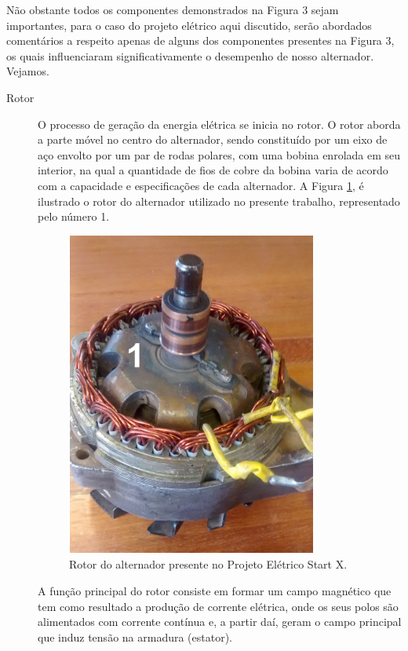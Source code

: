 Não obstante todos os componentes demonstrados na Figura 3 sejam importantes, para o caso do projeto elétrico aqui discutido, serão abordados comentários a respeito apenas de alguns dos componentes presentes na Figura 3, os quais influenciaram significativamente o desempenho de nosso alternador. Vejamos. 

\begin{description}

\item [Rotor]

O processo de geração da energia elétrica se inicia no rotor. O rotor aborda a parte móvel no centro do alternador, sendo constituído por um eixo de aço envolto por um par de rodas polares, com uma bobina enrolada em seu interior, na qual a quantidade de fios de cobre da bobina varia de acordo com a capacidade e especificações de cada alternador. A Figura \ref{rotor-alternador}, é ilustrado o rotor do alternador utilizado no presente trabalho, representado pelo número 1.

\begin{figure}[h]
	\centering
	\includegraphics[scale=0.2] {figuras/rotor_alternador.png}
	\caption{Rotor do alternador presente no Projeto Elétrico Start X.}
	\label{rotor-alternador}
\end{figure}

A função principal do rotor consiste em formar um campo magnético que tem como resultado a produção de corrente elétrica, onde os seus polos são alimentados com corrente contínua e, a partir daí, geram o campo principal que induz tensão na armadura (estator).


\end{description}
